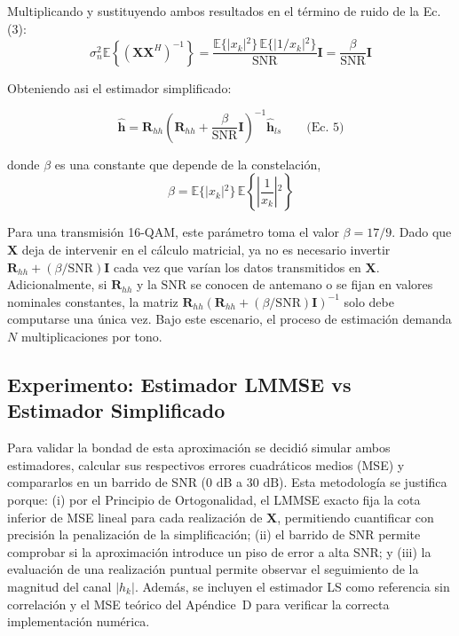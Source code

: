 \documentclass[a4paper]{article}
\begin{document}
Multiplicando y sustituyendo ambos resultados en el término de ruido de la Ec. (3):
$$\sigma_n^2 \mathbb{E}\left\{(\mathbf{X}\mathbf{X}^H)^{-1}\right\} = \frac{\mathbb{E}\{\vert{}x_k\vert{}^2\}\,\mathbb{E}\{\vert{}1/x_k\vert{}^2\}}{\text{SNR}}\mathbf{I} = \frac{\beta}{\text{SNR}}\mathbf{I}$$

Obteniendo asi el estimador simplificado:

$$\hat{\mathbf{h}} = \mathbf{R}_{hh}\left(\mathbf{R}_{hh} + \frac{\beta}{\text{SNR}}\mathbf{I}\right)^{-1} \hat{\mathbf{h}}_{ls} \qquad \text{(Ec. 5)}$$

donde $\beta$ es una constante que depende de la constelación, $$\beta = \mathbb{E}\{\vert{}x_k\vert{}^2\}\,\mathbb{E}\left\{\left\vert{}\frac{1}{x_k}\right\vert{}^2\right\}$$

Para una transmisión 16-QAM, este parámetro toma el valor $\beta = 17/9$. Dado que $\bm{X}$ deja de intervenir en el cálculo matricial, ya no es necesario invertir $\bm{R}_{hh} + (\beta/\mathrm{SNR})\bm{I}$ cada vez que varían los datos transmitidos en $\bm{X}$. Adicionalmente, si $\bm{R}_{hh}$ y la $\mathrm{SNR}$ se conocen de antemano o se fijan en valores nominales constantes, la matriz $\bm{R}_{hh}(\bm{R}_{hh} + (\beta/\mathrm{SNR})\bm{I})^{-1}$ solo debe computarse una única vez. Bajo este escenario, el proceso de estimación demanda $N$ multiplicaciones por tono.

\subsection*{Experimento: Estimador LMMSE vs Estimador Simplificado}

Para validar la bondad de esta aproximación se decidió simular ambos estimadores, calcular sus respectivos errores cuadráticos medios (MSE) y compararlos en un barrido de SNR ($0\text{ dB}$ a $30\text{ dB}$). Esta metodología se justifica porque: (i) por el Principio de Ortogonalidad, el LMMSE exacto fija la cota inferior de MSE lineal para cada realización de $\mathbf{X}$, permitiendo cuantificar con precisión la penalización de la simplificación; (ii) el barrido de SNR permite comprobar si la aproximación introduce un piso de error a alta SNR; y (iii) la evaluación de una realización puntual permite observar el seguimiento de la magnitud del canal $|h_k|$. Además, se incluyen el estimador LS como referencia sin correlación y el MSE teórico del Apéndice~D para verificar la correcta implementación numérica.
\end{document}
